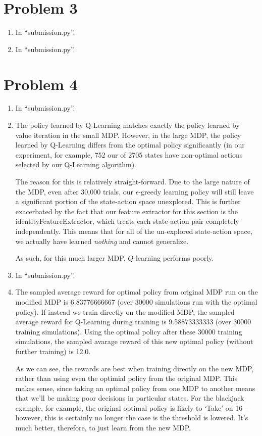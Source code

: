\documentclass[12pt]{article}
\begin{document}
\section*{Problem 3}

\begin{enumerate}[label=(\alph*)]
  \item In ``submission.py''.
  \item In ``submission.py''.
\end{enumerate}

\section*{Problem 4}
\begin{enumerate}[label=(\alph*)]
  \item In ``submission.py''.
  \item The policy learned by Q-Learning matches exactly the policy learned by value iteration in the small MDP. However, in the large MDP, the policy learned by Q-Learning differs from the optimal policy significantly (in our experiment, for example, 752 our of 2705 states have non-optimal actions selected by our Q-Learning algorithm). 

  The reason for this is relatively straight-forward. Due to the large nature of the MDP, even after 30,000 trials, our $\epsilon$-greedy learning policy will still leave a significant portion of the state-action space unexplored. This is further exacerbated by the fact that our feature extractor for this section is the identityFeatureExtractor, which treats each state-action pair completely independently. This means that for all of the un-explored state-action space, we actually have learned \textit{nothing} and cannot generalize.

  As such, for this much larger MDP, $Q$-learning performs poorly.
  \item In ``submission.py''.
  \item The sampled average reward for optimal policy from original MDP run on the modified MDP is 6.83776666667 (over 30000 simulations run with the optimal policy). If instead we train directly on the modified MDP, the sampled average reward for Q-Learning during training is 9.58873333333 (over 30000 training simulations). Using the optimal policy after these 30000 training simulations, the sampled avarage reward of this new optimal policy (without further training) is 12.0.

  As we can see, the rewards are best when training directly on the new MDP, rather than using even the optimial policy from the original MDP. This makes sense, since taking an optimal policy from one MDP to another means that we'll be making poor decisions in particular states. For the blackjack example, for example, the original optimal policy is likely to `Take' on 16 -- however, this is certainly no longer the case is the threshold is lowered. It's much better, therefore, to just learn from the new MDP.
\end{enumerate}
\end{document}
